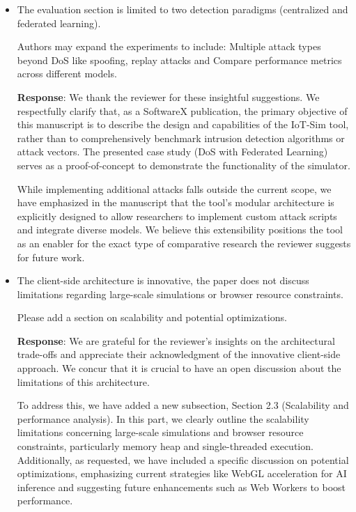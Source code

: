 \documentclass[12pt, a4paper]{article}
\begin{document}
\begin{itemize}
    \item The evaluation section is limited to two detection paradigms (centralized and federated learning).
    
    Authors may expand the experiments to include: Multiple attack types beyond DoS like spoofing, replay attacks and Compare performance metrics across different models.

    {\color{blue}
        \textbf{Response}: We thank the reviewer for these insightful suggestions. We respectfully clarify that, as a SoftwareX publication, the primary objective of this manuscript is to describe the design and capabilities of the IoT-Sim tool, rather than to comprehensively benchmark intrusion detection algorithms or attack vectors. The presented case study (DoS with Federated Learning) serves as a proof-of-concept to demonstrate the functionality of the simulator.

        While implementing additional attacks falls outside the current scope, we have emphasized in the manuscript that the tool's modular architecture is explicitly designed to allow researchers to implement custom attack scripts and integrate diverse models. We believe this extensibility positions the tool as an enabler for the exact type of comparative research the reviewer suggests for future work.
    }

    \item The client-side architecture is innovative, the paper does not discuss limitations regarding large-scale simulations or browser resource constraints.
    
    Please add a section on scalability and potential optimizations.

    {\color{blue}
        \textbf{Response}: We are grateful for the reviewer's insights on the architectural trade-offs and appreciate their acknowledgment of the innovative client-side approach. We concur that it is crucial to have an open discussion about the limitations of this architecture.

        To address this, we have added a new subsection, Section 2.3 (Scalability and performance analysis). In this part, we clearly outline the scalability limitations concerning large-scale simulations and browser resource constraints, particularly memory heap and single-threaded execution. Additionally, as requested, we have included a specific discussion on potential optimizations, emphasizing current strategies like WebGL acceleration for AI inference and suggesting future enhancements such as Web Workers to boost performance.
    }


\end{itemize}
\end{document}
